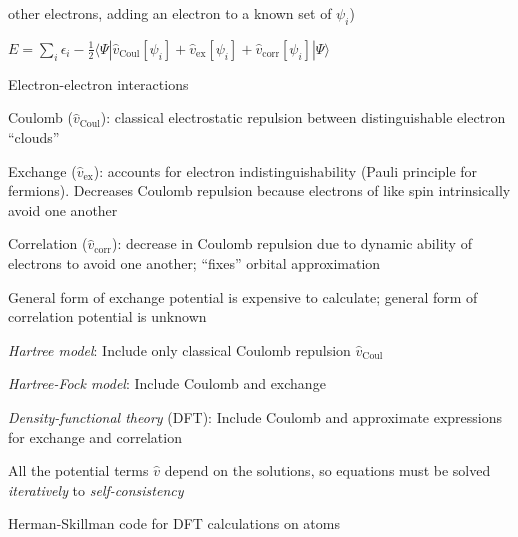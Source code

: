 \message{ !name(Outline.tex)}\documentclass[11pt]{article}
\begin{document}
\begin{outline}
\begin{outline}
\begin{outline}
\begin{outline}
         other electrons, adding an electron to a known set of $\psi_i$)
       \item $E=\sum_i \epsilon_i-\frac{1}{2}\langle \Psi |\hat v_\mathrm{Coul}[\psi_i] + \hat
           v_\mathrm{ex}[\psi_i]+\hat v_\mathrm{corr}[\psi_i]|\Psi \rangle$
       \end{outline}
     \item Electron-electron interactions
       \begin{outline}
       \item Coulomb ($\hat v_\mathrm{Coul}$): classical electrostatic
         repulsion between distinguishable electron ``clouds''
       \item Exchange ($\hat v_\mathrm{ex}$): accounts for electron
         indistinguishability (Pauli principle for fermions).  Decreases
         Coulomb repulsion because electrons of like spin intrinsically avoid
         one another
       \item Correlation ($\hat v_\mathrm{corr}$): decrease in Coulomb
         repulsion due to dynamic ability of electrons to avoid one another;
         ``fixes'' orbital approximation
       \end{outline}
     \item General form of exchange potential is expensive to calculate; general
       form of correlation potential is unknown
       \begin{outline}
     \item {\em Hartree model}: Include only classical Coulomb repulsion $\hat
       v_\mathrm{Coul}$
     \item {\em Hartree-Fock model}: Include Coulomb and exchange
     \item {\em Density-functional theory} (DFT): Include Coulomb and
       approximate expressions for exchange and correlation         
       \end{outline}
     \item All the potential terms $\hat v$ depend on the solutions, so equations
       must be solved {\em iteratively} to {\em self-consistency}
     \end{outline}
   \item Herman-Skillman code for DFT calculations on atoms
   \end{outline}


\end{outline}
\end{document}
